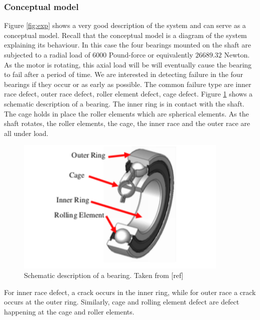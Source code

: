 \documentclass[11pt, oneside]{article}   	%
\begin{document}
\subsubsection{Conceptual model}
Figure \ref{fig:exp} shows a very good description of the system and can serve as a conceptual model. Recall that the conceptual model is a diagram of the system explaining its behaviour.
In this case the four bearings mounted on the shaft are subjected to a radial load of 6000 Pound-force or equivalently $26689.32$ Newton. As the motor is rotating, this axial load will be will eventually cause the bearing to fail after a period of time.
\justify
We are interested in detecting failure in the four bearings if they occur or as early as possible. The common failure type are inner race defect, outer race defect, roller element defect, cage defect. Figure \ref{fig:bearing-schema} shows a schematic description of a bearing. The inner ring is in contact with the shaft. The cage holds in place the roller elements which are spherical elements. As the shaft rotates, the roller elements, the cage, the inner race and the outer race are all under load.
\begin{figure}[H] %
   \centering
   \includegraphics[width=4in]{thesis-pictures/bearing} 
   \caption{Schematic description of a bearing. Taken from [ref]}
   \label{fig:bearing-schema}
\end{figure}
\justify
For inner race defect, a crack occurs in the inner ring, while for outer race a crack occurs at the outer ring. Similarly, cage and rolling element defect are defect happening at the cage and roller elements.
\end{document}
